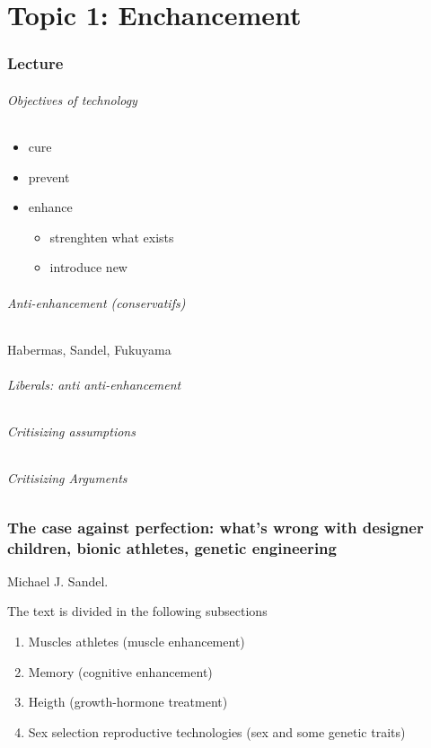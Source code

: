 \documentclass[../main/main.tex]{subfiles}
\begin{document}
\part{Topic 1: Enchancement}
\section{Lecture}
\paragraph{Objectives of technology}
\begin{itemize}
\item cure
\item prevent
\item enhance
\begin{itemize}
\item strenghten what exists
\item introduce new
\end{itemize}
\end{itemize}

\paragraph{Anti-enhancement (conservatifs)}
Habermas, Sandel, Fukuyama

\paragraph{Liberals: anti anti-enhancement}

\paragraph{Critisizing assumptions}

\paragraph{Critisizing Arguments}

\newpage
\section{The case against perfection: what's wrong with designer children, bionic athletes, genetic engineering}
Michael J. Sandel.

The text is divided in the following subsections
\begin{enumerate}
\item Muscles \hfill athletes (muscle enhancement)
\item Memory \hfill (cognitive enhancement)
\item Heigth \hfill (growth-hormone treatment)
\item Sex selection \hfill reproductive technologies (sex and some genetic traits)
\end{enumerate}
\end{document}
